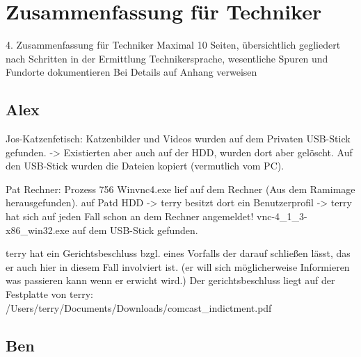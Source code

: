\chapter{Zusammenfassung für Techniker}
\label{sec:tec}


4. Zusammenfassung für Techniker
Maximal 10 Seiten, übersichtlich gegliedert nach Schritten in der Ermittlung
Technikersprache, wesentliche Spuren und Fundorte dokumentieren
Bei Details auf Anhang verweisen

\section{Alex}
Jos-Katzenfetisch:
Katzenbilder und Videos wurden auf dem Privaten USB-Stick gefunden. -> Existierten aber auch auf der HDD, wurden dort aber gelöscht.
Auf den USB-Stick wurden die Dateien kopiert (vermutlich vom PC).

Pat Rechner:
Prozess 756 Winvnc4.exe lief auf dem Rechner (Aus dem Ramimage herausgefunden).
auf Patd HDD -> terry besitzt dort ein Benutzerprofil -> terry hat sich auf jeden Fall schon an dem Rechner angemeldet!
  vnc-4_1_3-x86_win32.exe auf dem USB-Stick gefunden.

terry hat ein Gerichtsbeschluss bzgl. eines Vorfalls der darauf schließen lässt, das er auch hier in diesem Fall involviert ist. (er will sich möglicherweise Informieren was passieren kann wenn er erwicht wird.)
Der gerichtsbeschluss liegt auf der Festplatte von terry:
/Users/terry/Documents/Downloads/comcast_indictment.pdf

\section{Ben}
